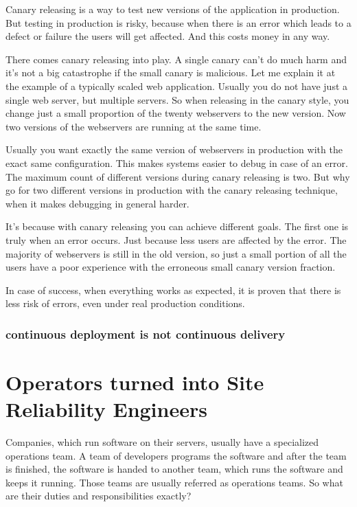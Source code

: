 Canary releasing is a way to test new versions of the application in production. But testing in production is risky, because when there is an error which leads to a defect or failure the users will get affected. And this costs money in any way.

There comes canary releasing into play. A single canary can't do much harm and it's not a big catastrophe if the small canary is malicious. Let me explain it at the example of a typically scaled web application. Usually you do not have just a single web server, but multiple servers. So when releasing in the canary style, you change just a small proportion of the twenty webservers to the new version. Now two versions of the webservers are running at the same time.

Usually you want exactly the same version of webservers in production with the exact same configuration. This makes systems easier to debug in case of an error. The maximum count of different versions during canary releasing is two. But why go for two different versions in production with the canary releasing technique, when it makes debugging in general harder.

It's because with canary releasing you can achieve different goals. The first one is truly when an error occurs. Just because less users are affected by the error. The majority of webservers is still in the old version, so just a small portion of all the users have a poor experience with the erroneous small canary version fraction.

In case of success, when everything works as expected, it is proven that there is less risk of errors, even under real production conditions.


\subsection{continuous deployment is not continuous delivery}

\chapter{Operators turned into Site Reliability Engineers}

Companies, which run software on their servers, usually have a specialized operations team. A team of developers programs the software and after the team is finished, the software is handed to another team, which runs the software and keeps it running. Those teams are usually referred as operations teams. So what are their duties and responsibilities exactly?


